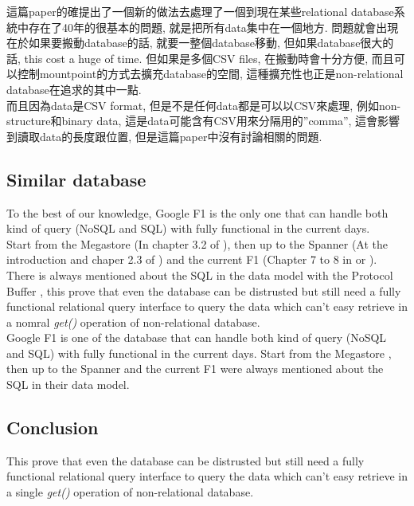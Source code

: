 這篇paper的確提出了一個新的做法去處理了一個到現在某些relational database系統中存在了40年的很基本的問題, 就是把所有data集中在一個地方. 問題就會出現在於如果要搬動database的話, 就要一整個database移動, 但如果database很大的話, this cost a huge of time. 但如果是多個CSV files, 在搬動時會十分方便, 而且可以控制mountpoint的方式去擴充database的空間, 這種擴充性也正是non-relational database在追求的其中一點.\\

而且因為data是CSV format, 但是不是任何data都是可以以CSV來處理, 例如non-structure和binary data, 這是data可能含有CSV用來分隔用的”comma”, 這會影響到讀取data的長度跟位置, 但是這篇paper中沒有討論相關的問題.

\clearpage

\subsection{Similar database}

\medskip
To the best of our knowledge, Google F1 is the only one that can handle both kind of query (NoSQL and SQL) with fully functional in the current days.\\

Start from the Megastore (In chapter 3.2 of \cite{paper:google-megastore}), then up to the Spanner (At the introduction and chaper 2.3 of \cite{paper:google-spanner-1}) and the current F1 (Chapter 7 to 8 in \cite{paper:google-f1} or \cite{paper:google-f1-ad-business}). There is always mentioned about the SQL in the data model with the Protocol Buffer \cite{web:google:protocol-buffers}, this prove that even the database can be distrusted but still need a fully functional relational query interface to query the data which can't easy retrieve in a nomral \textit{get()} operation of non-relational database.\\

Google F1 is one of the database that can handle both kind of query (NoSQL and SQL) with fully functional in the current days. Start from the Megastore \cite{paper:google-megastore}, then up to the Spanner \cite{paper:google-spanner-1} and the current F1 \cite{paper:google-f1,paper:google-f1-ad-business} were always mentioned about the SQL in their data model.

\subsection{Conclusion}

This prove that even the database can be distrusted but still need a fully functional relational query interface to query the data which can't easy retrieve in a single \textit{get()} operation of non-relational database.

\clearpage

